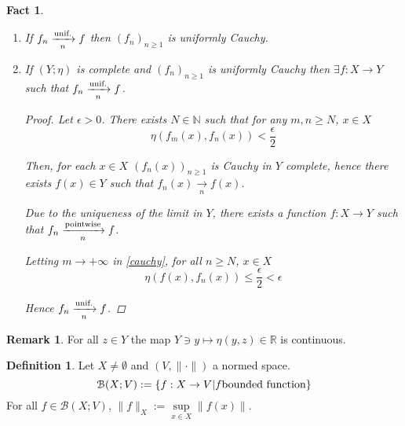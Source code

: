 \documentclass[12pt]{amsbook}
\newtheorem{fact}[theorem]{Fact}
\theoremstyle{definition}
\newtheorem{definition}[theorem]{Definition}
\newtheorem{remark}[theorem]{Remark}
\newcommand{\NN}{{\mathbb N}}
\newcommand{\RR}{{\mathbb R}}
\newcommand{\cB}{{\mathcal B}}
\newcommand{\ra}{\rightarrow} %
\begin{document}
\begin{fact}
\begin{enumerate}
\item If $f_n \xrightarrow[n]{\textup{unif.}} f$ then $(f_n)_{n \geq 1}$ is uniformly Cauchy.

\item If $(Y; \eta)$ is complete and $(f_n)_{n \geq 1}$ is uniformly Cauchy then $\exists f: X \ra Y$ such that $f_n \xrightarrow[n]{\textup{unif.}} f$.

\begin{proof}
Let $\epsilon > 0$. There exists $N \in \NN$ such that for any $m, n \geq N$, $x \in X$ 
\begin{equation}
\eta(f_m(x), f_n(x)) < \frac{\epsilon}{2} \label{cauchy} \tag{$*$}
\end{equation}

Then, for each $x \in X$ $(f_n(x))_{n \geq 1}$ is Cauchy in $Y$ complete, hence there exists $f(x) \in Y$ such that $f_n(x) \xrightarrow[n]{} f(x)$.

Due to the uniqueness of the limit in $Y$, there exists a function $f: X \ra Y$ such that $f_n \xrightarrow[n]{\textup{pointwise}} f$.

Letting $m \ra +\infty$ in \eqref{cauchy}, for all $n \geq N$, $x \in X$
\begin{equation*}
\eta(f(x), f_n(x)) \leq \frac{\epsilon}{2} < \epsilon
\end{equation*}

Hence $f_n \xrightarrow[n]{\textup{unif.}} f$.
\end{proof}
\end{enumerate}
\end{fact}

\begin{remark}
For all $z \in Y$ the map $Y \ni y \mapsto \eta(y, z) \in \RR$ is continuous.
\end{remark}


\begin{definition}
Let $X \neq \emptyset$ and $(V, \|\cdot\|)$ a normed space. 
\begin{equation*}
\cB(X; V) := \left\{f : X \ra V | f \textup{bounded function} \right\}
\end{equation*}
For all $f \in \cB(X; V)$, $\|f\|_X := \underset{x \in X}\sup \|f(x)\|$.
\end{definition}
\end{document}
